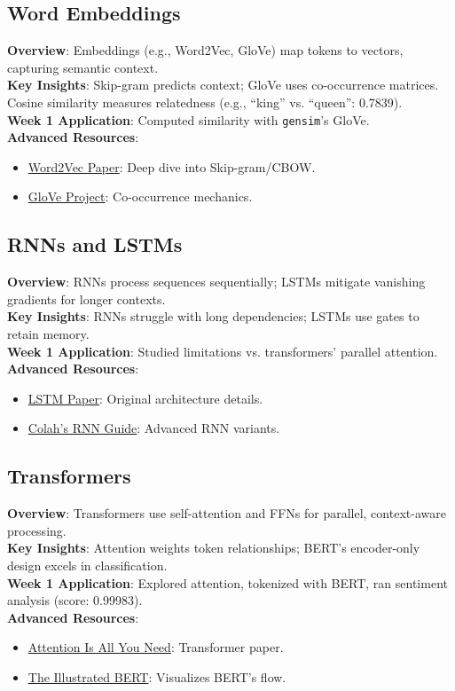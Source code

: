 \documentclass[a4paper,12pt]{article}
\begin{document}
\subsection*{Word Embeddings}
\textbf{Overview}: Embeddings (e.g., Word2Vec, GloVe) map tokens to vectors, capturing semantic context. \\
\textbf{Key Insights}: Skip-gram predicts context; GloVe uses co-occurrence matrices. Cosine similarity measures relatedness (e.g., ``king'' vs. ``queen'': 0.7839). \\
\textbf{Week 1 Application}: Computed similarity with \texttt{gensim}’s GloVe. \\
\textbf{Advanced Resources}:
\begin{itemize}
    \item \href{https://arxiv.org/abs/1301.3781}{Word2Vec Paper}: Deep dive into Skip-gram/CBOW.
    \item \href{https://nlp.stanford.edu/projects/glove}{GloVe Project}: Co-occurrence mechanics.
\end{itemize}

\subsection*{RNNs and LSTMs}
\textbf{Overview}: RNNs process sequences sequentially; LSTMs mitigate vanishing gradients for longer contexts. \\
\textbf{Key Insights}: RNNs struggle with long dependencies; LSTMs use gates to retain memory. \\
\textbf{Week 1 Application}: Studied limitations vs. transformers’ parallel attention. \\
\textbf{Advanced Resources}:
\begin{itemize}
    \item \href{https://arxiv.org/abs/1406.1078}{LSTM Paper}: Original architecture details.
    \item \href{https://colah.github.io/posts/2015-09-NN-Types-FP}{Colah’s RNN Guide}: Advanced RNN variants.
\end{itemize}

\subsection*{Transformers}
\textbf{Overview}: Transformers use self-attention and FFNs for parallel, context-aware processing. \\
\textbf{Key Insights}: Attention weights token relationships; BERT’s encoder-only design excels in classification. \\
\textbf{Week 1 Application}: Explored attention, tokenized with BERT, ran sentiment analysis (score: 0.99983). \\
\textbf{Advanced Resources}:
\begin{itemize}
    \item \href{https://arxiv.org/abs/1706.03762}{Attention Is All You Need}: Transformer paper.
    \item \href{https://jalammar.github.io/illustrated-bert}{The Illustrated BERT}: Visualizes BERT’s flow.
\end{itemize}
\end{document}
